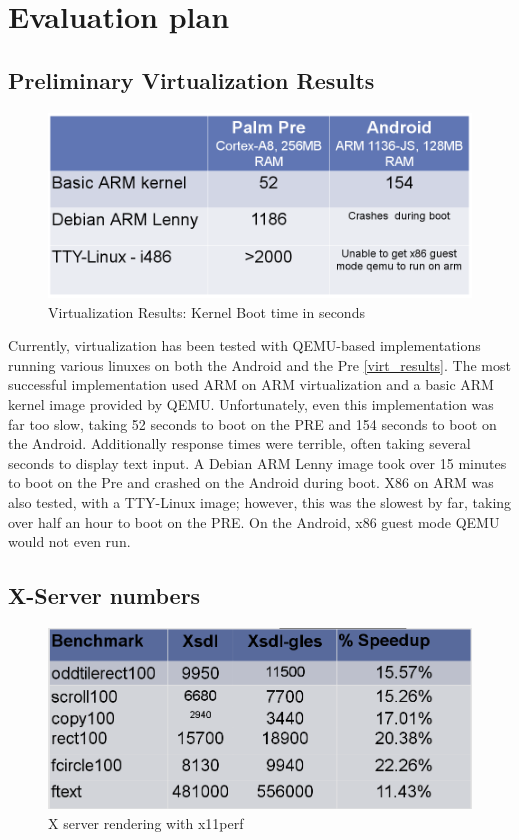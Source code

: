 \section{Evaluation plan}

\subsection{Preliminary Virtualization Results}

\begin{figure}[tbh]
\centering
\includegraphics[width=1.0\columnwidth]{virtualization_results}
\caption{Virtualization Results: Kernel Boot time in seconds}
\label{fig:virt_results}
\end{figure}

Currently, virtualization has been tested with QEMU-based implementations running various linuxes on both the Android and the Pre \ref{virt_results}.  The most successful implementation used ARM on ARM virtualization and a basic ARM kernel image provided by QEMU.  Unfortunately, even this implementation was far too slow, taking 52 seconds to boot on the PRE and 154 seconds to boot on the Android.  Additionally response times were terrible, often taking several seconds to display text input.  A Debian ARM Lenny image took over 15 minutes to boot on the Pre and crashed on the Android during boot.  X86 on ARM was also tested, with a TTY-Linux image; however, this was the slowest by far, taking over half an hour to boot on the PRE.  On the Android, x86 guest mode QEMU would not even run.

\subsection{X-Server numbers}

\begin{figure}[tbh]
\centering
\includegraphics[width=1.0\columnwidth]{x_results}
\caption{X server rendering with x11perf}
\label{fig:x_results}
\end{figure}
